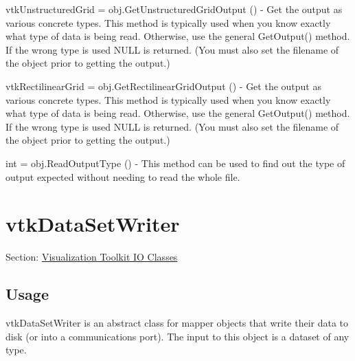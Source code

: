 \begin{DoxyItemize}
\item {\ttfamily vtk\-Unstructured\-Grid = obj.\-Get\-Unstructured\-Grid\-Output ()} -\/ Get the output as various concrete types. This method is typically used when you know exactly what type of data is being read. Otherwise, use the general Get\-Output() method. If the wrong type is used N\-U\-L\-L is returned. (You must also set the filename of the object prior to getting the output.)  
\item {\ttfamily vtk\-Rectilinear\-Grid = obj.\-Get\-Rectilinear\-Grid\-Output ()} -\/ Get the output as various concrete types. This method is typically used when you know exactly what type of data is being read. Otherwise, use the general Get\-Output() method. If the wrong type is used N\-U\-L\-L is returned. (You must also set the filename of the object prior to getting the output.)  
\item {\ttfamily int = obj.\-Read\-Output\-Type ()} -\/ This method can be used to find out the type of output expected without needing to read the whole file.  
\end{DoxyItemize}\hypertarget{vtkio_vtkdatasetwriter}{}\section{vtk\-Data\-Set\-Writer}\label{vtkio_vtkdatasetwriter}
Section\-: \hyperlink{sec_vtkio}{Visualization Toolkit I\-O Classes} \hypertarget{vtkwidgets_vtkxyplotwidget_Usage}{}\subsection{Usage}\label{vtkwidgets_vtkxyplotwidget_Usage}
vtk\-Data\-Set\-Writer is an abstract class for mapper objects that write their data to disk (or into a communications port). The input to this object is a dataset of any type.

